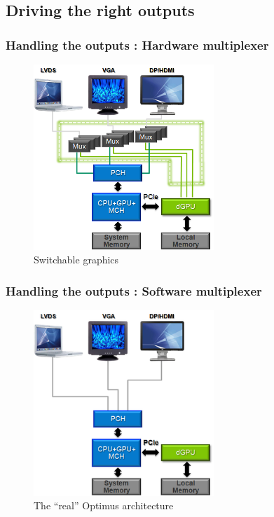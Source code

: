\documentclass[11pt,english,compress]{beamer}
\begin{document}
\subsection{Driving the right outputs}
\begin{frame}
	\frametitle{Handling the outputs : Hardware multiplexer}

	\begin{figure}[h]
		\centering
		\includegraphics[height=7cm]{imgs/optimus_hw_mux.png}
		\caption{Switchable graphics}
	\end{figure}
\end{frame}

\begin{frame}
	\frametitle{Handling the outputs : Software multiplexer}

	\begin{figure}[h]
		\centering
		\includegraphics[height=7cm]{imgs/optimus_sw_mux.png}
		\caption{The ``real'' Optimus architecture}
	\end{figure}
\end{frame}
\end{document}
